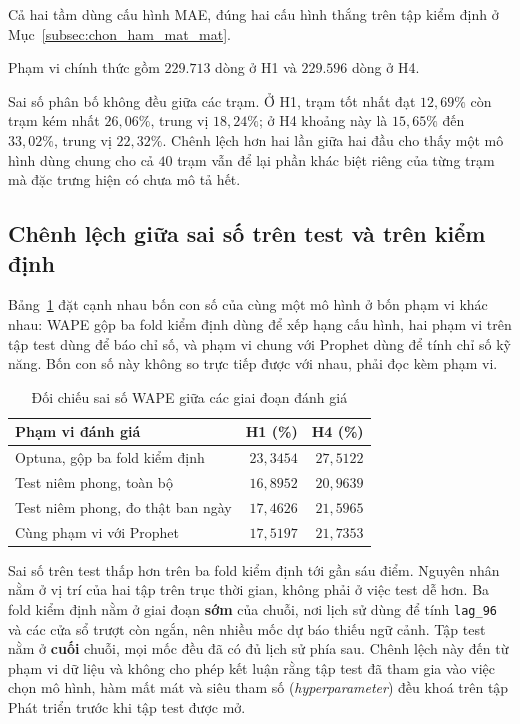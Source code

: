 \documentclass[12pt, a4paper]{report}
\begin{document}
Cả hai tầm dùng cấu hình MAE, đúng hai cấu hình thắng trên tập kiểm định ở Mục~\ref{subsec:chon_ham_mat_mat}.

Phạm vi chính thức gồm $229.713$ dòng ở H1 và $229.596$ dòng ở H4.

Sai số phân bố không đều giữa các trạm. Ở H1, trạm tốt nhất đạt $12{,}69\%$ còn trạm kém nhất
$26{,}06\%$, trung vị $18{,}24\%$; ở H4 khoảng này là $15{,}65\%$ đến $33{,}02\%$, trung vị
$22{,}32\%$. Chênh lệch hơn hai lần giữa hai đầu cho thấy một mô hình dùng chung cho cả $40$
trạm vẫn để lại phần khác biệt riêng của từng trạm mà đặc trưng hiện có chưa mô tả hết.

\FloatBarrier
\subsection{Chênh lệch giữa sai số trên test và trên kiểm định}

Bảng~\ref{tab:ba_pham_vi} đặt cạnh nhau bốn con số của cùng một mô hình ở bốn phạm vi khác
nhau: WAPE gộp ba fold kiểm định dùng để xếp hạng cấu hình, hai phạm vi trên tập test dùng để
báo chỉ số, và phạm vi chung với Prophet dùng để tính chỉ số kỹ năng. Bốn con số này không so
trực tiếp được với nhau, phải đọc kèm phạm vi.

\begin{table}[htbp]
\centering
\caption{Đối chiếu sai số WAPE giữa các giai đoạn đánh giá}
\label{tab:ba_pham_vi}
\small
\begin{tabular}{l r r}
\toprule
\textbf{Phạm vi đánh giá} & \textbf{H1 (\%)} & \textbf{H4 (\%)} \\
\midrule
Optuna, gộp ba fold kiểm định   & $23{,}3454$ & $27{,}5122$ \\
Test niêm phong, toàn bộ        & $16{,}8952$ & $20{,}9639$ \\
Test niêm phong, đo thật ban ngày & $17{,}4626$ & $21{,}5965$ \\
Cùng phạm vi với Prophet        & $17{,}5197$ & $21{,}7353$ \\
\bottomrule
\end{tabular}


\end{table}

Sai số trên test thấp hơn trên ba fold kiểm định tới gần sáu điểm. Nguyên nhân nằm ở vị trí của
hai tập trên trục thời gian, không phải ở việc test dễ hơn. Ba fold kiểm định nằm ở giai đoạn
\textbf{sớm} của chuỗi, nơi lịch sử dùng để tính \texttt{lag\_96} và các cửa sổ trượt còn ngắn, nên
nhiều mốc dự báo thiếu ngữ cảnh. Tập test nằm ở \textbf{cuối} chuỗi, mọi mốc đều đã có đủ lịch
sử phía sau. Chênh lệch này đến từ phạm vi dữ liệu và không cho phép kết luận rằng tập test đã
tham gia vào việc chọn mô hình, hàm mất mát và siêu tham số (\textit{hyperparameter}) đều khoá trên tập Phát triển
trước khi tập test được mở.
\end{document}
